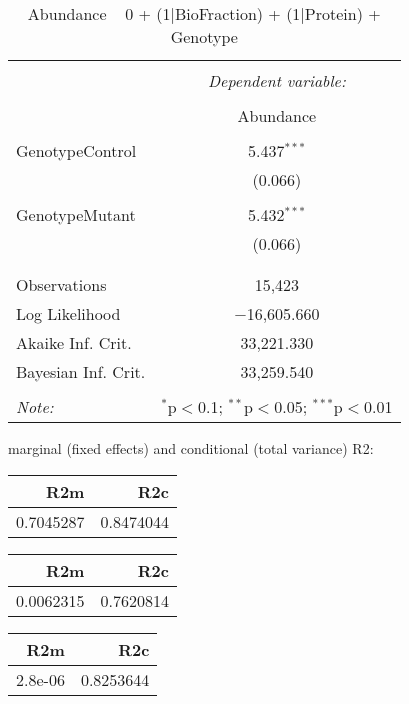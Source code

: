 \documentclass[11pt]{report}
\begin{document}
\begin{table}[!htbp] \centering 
  \caption{Abundance ~ 0 + (1|BioFraction) + (1|Protein) + Genotype} 
  \label{} 
\begin{tabular}{@{\extracolsep{5pt}}lc} 
\\[-1.8ex]\hline 
\hline \\[-1.8ex] 
 & \multicolumn{1}{c}{\textit{Dependent variable:}} \\ 
\cline{2-2} 
\\[-1.8ex] & Abundance \\ 
\hline \\[-1.8ex] 
 GenotypeControl & 5.437$^{***}$ \\ 
  & (0.066) \\ 
  & \\ 
 GenotypeMutant & 5.432$^{***}$ \\ 
  & (0.066) \\ 
  & \\ 
\hline \\[-1.8ex] 
Observations & 15,423 \\ 
Log Likelihood & $-$16,605.660 \\ 
Akaike Inf. Crit. & 33,221.330 \\ 
Bayesian Inf. Crit. & 33,259.540 \\ 
\hline 
\hline \\[-1.8ex] 
\textit{Note:}  & \multicolumn{1}{r}{$^{*}$p$<$0.1; $^{**}$p$<$0.05; $^{***}$p$<$0.01} \\ 
\end{tabular} 
\end{table} 
marginal (fixed effects) and conditional (total variance) R2:

\begin{tabular}{r|r}
\hline
R2m & R2c\\
\hline
0.7045287 & 0.8474044\\
\hline
\end{tabular}

\begin{tabular}{r|r}
\hline
R2m & R2c\\
\hline
0.0062315 & 0.7620814\\
\hline
\end{tabular}

\begin{tabular}{r|r}
\hline
R2m & R2c\\
\hline
2.8e-06 & 0.8253644\\
\hline
\end{tabular}
\end{document}
